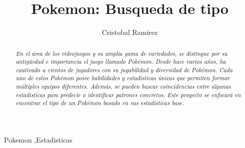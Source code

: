 \documentclass[]{elsarticle}
\begin{document}
\renewcommand{\labelenumii}{\arabic{enumi}.\arabic{enumii}}

\begin{frontmatter}



\title{Pokemon: Busqueda de tipo}


\author[label1]{Cristobal Ramirez}
\address[label1]{Estudiante Ingenieria Civil Informatica,cristohbal.ramirez1501@alumnos.ubiobio.cl}

\begin{abstract}


\textit{En el área de los videojuegos y su amplia gama de variedades, se distingue por su antigüedad e importancia el juego llamado Pokémon. Desde hace varios años, ha cautivado a cientos de jugadores con su jugabilidad y diversidad de Pokémon. Cada uno de estos Pokémon posee habilidades y estadísticas únicas que permiten formar múltiples equipos diferentes. Además, se pueden buscar coincidencias entre algunas estadísticas para predecir o identificar patrones concretos. Este proyecto se enfocará en encontrar el tipo de un Pokémon basado en sus estadísticas base.}
\end{abstract}

\begin{keyword}
Pokemon \sep Estadisticas



\end{keyword}

\end{frontmatter}
\end{document}
